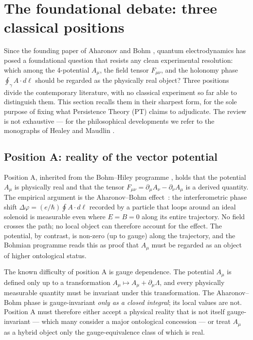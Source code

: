\section{The foundational debate: three classical positions}
\label{sec:debate}

Since the founding paper of Aharonov and Bohm
\cite{AharonovBohm1959}, quantum electrodynamics has posed a
foundational question that resists any clean experimental
resolution: which among the 4-potential $A_\mu$, the field tensor
$F_{\mu\nu}$, and the holonomy phase $\oint_\gamma A \cdot d\ell$
should be regarded as the physically real object? Three
positions divide the contemporary literature, with no classical
experiment so far able to distinguish them. This section recalls
them in their sharpest form, for the sole purpose of fixing what
Persistence Theory (PT) claims to adjudicate. The review is not
exhaustive --- for the philosophical developments we refer to the
monographs of Healey \cite{Healey2007} and Maudlin
\cite{Maudlin2011}.

\subsection{Position A: reality of the vector potential}
\label{ssec:position_A_en}

Position A, inherited from the Bohm--Hiley programme
\cite{BohmHiley1993}, holds that the potential $A_\mu$ is
physically real and that the tensor $F_{\mu\nu} = \partial_\mu A_\nu
- \partial_\nu A_\mu$ is a derived quantity. The empirical argument
is the Aharonov--Bohm effect~\cite{AharonovBohm1959}: the
interferometric phase shift $\Delta\varphi = (e/\hbar) \oint A \cdot
d\ell$ recorded by a particle that loops around an ideal solenoid
is measurable even where $E = B = 0$ along its entire trajectory.
No field crosses the path; no local object can therefore account
for the effect. The potential, by contrast, is non-zero (up to
gauge) along the trajectory, and the Bohmian programme reads this
as proof that $A_\mu$ must be regarded as an object of higher
ontological status.

The known difficulty of position A is gauge dependence. The
potential $A_\mu$ is defined only up to a transformation
$A_\mu \mapsto A_\mu + \partial_\mu \Lambda$, and every physically
measurable quantity must be invariant under this transformation.
The Aharonov--Bohm phase is gauge-invariant \emph{only as a closed
integral}; its local values are not. Position A must therefore
either accept a physical reality that is not itself gauge-invariant
--- which many consider a major ontological concession --- or
treat $A_\mu$ as a hybrid object only the gauge-equivalence class
of which is real.

